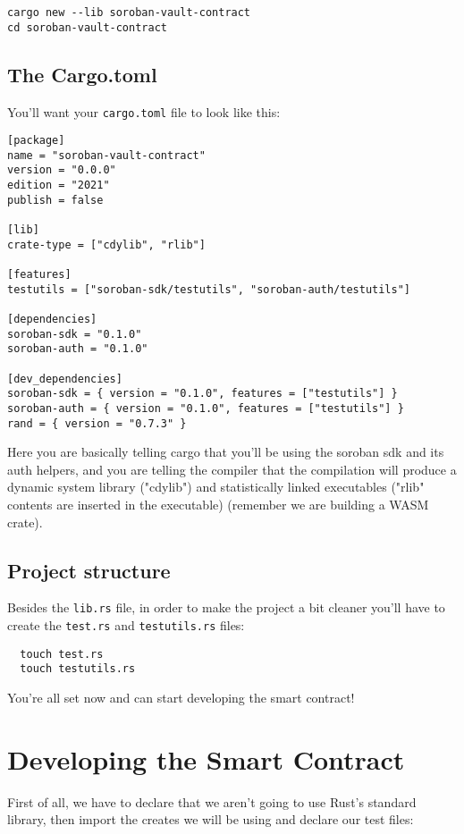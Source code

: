 \documentclass{article}
\newcommand{\inl}[1]{\lstinline{#1}}
\begin{document}
\begin{lstlisting}
cargo new --lib soroban-vault-contract
cd soroban-vault-contract
\end{lstlisting}


\subsection{The Cargo.toml}
You'll want your \inl{cargo.toml} file to look like this:

\begin{lstlisting}
[package]
name = "soroban-vault-contract"
version = "0.0.0"
edition = "2021"
publish = false

[lib]
crate-type = ["cdylib", "rlib"]

[features]
testutils = ["soroban-sdk/testutils", "soroban-auth/testutils"]

[dependencies]
soroban-sdk = "0.1.0"
soroban-auth = "0.1.0"

[dev_dependencies]
soroban-sdk = { version = "0.1.0", features = ["testutils"] }
soroban-auth = { version = "0.1.0", features = ["testutils"] }
rand = { version = "0.7.3" }

\end{lstlisting}

Here you are basically telling cargo that you'll be using the soroban sdk and its auth helpers, and you are telling the compiler that the compilation will produce a dynamic system library ("cdylib") and statistically linked executables ("rlib" contents are inserted in the executable) (remember we are building a WASM crate).

\subsection{Project structure}
Besides the \inl{lib.rs} file, in order to make the project a bit cleaner you'll have to create the \inl{test.rs} and \inl{testutils.rs} files:

\begin{lstlisting}
  touch test.rs
  touch testutils.rs
\end{lstlisting}

You're all set now and can start developing the smart contract!

\section{Developing the Smart Contract}

First of all, we have to declare that we aren't going to use Rust's standard library, then import the creates we will be using and declare our test files:
\end{document}
